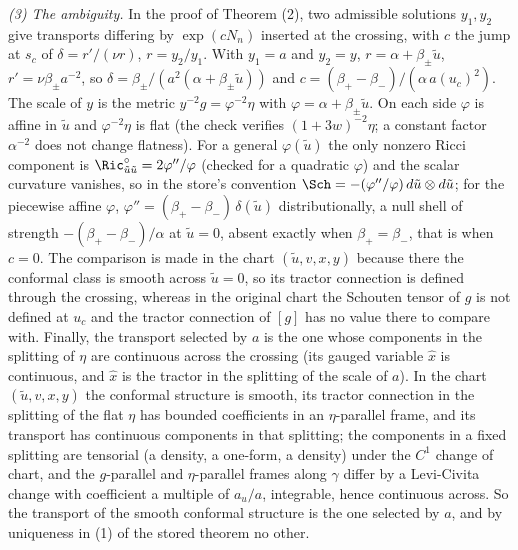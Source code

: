 \emph{(3) The ambiguity.} In the proof of Theorem (2), two admissible solutions $y_1, y_2$ give transports differing by $\exp(cN_n)$ inserted at the crossing, with $c$ the jump at $s_c$ of $\delta = r'/(\nu r)$, $r = y_2/y_1$. With $y_1 = a$ and $y_2 = y$, $r = \alpha + \beta_\pm\tilde u$, $r' = \nu\beta_\pm a^{-2}$, so $\delta = \beta_\pm/(a^2(\alpha + \beta_\pm\tilde u))$ and $c = (\beta_+ - \beta_-)/(\alpha\,a(u_c)^2)$. The scale of $y$ is the metric $y^{-2}g = \varphi^{-2}\eta$ with $\varphi = \alpha + \beta_\pm\tilde u$. On each side $\varphi$ is affine in $\tilde u$ and $\varphi^{-2}\eta$ is flat (the check verifies $(1 + 3w)^{-2}\eta$; a constant factor $\alpha^{-2}$ does not change flatness). For a general $\varphi(\tilde u)$ the only nonzero Ricci component is $\Ric^{\circ}_{\tilde u\tilde u} = 2\varphi''/\varphi$ (checked for a quadratic $\varphi$) and the scalar curvature vanishes, so in the store's convention $\Sch = -(\varphi''/\varphi)\,d\tilde u\otimes d\tilde u$; for the piecewise affine $\varphi$, $\varphi'' = (\beta_+ - \beta_-)\,\delta(\tilde u)$ distributionally, a null shell of strength $-(\beta_+ - \beta_-)/\alpha$ at $\tilde u = 0$, absent exactly when $\beta_+ = \beta_-$, that is when $c = 0$. The comparison is made in the chart $(\tilde u, v, x, y)$ because there the conformal class is smooth across $\tilde u = 0$, so its tractor connection is defined through the crossing, whereas in the original chart the Schouten tensor of $g$ is not defined at $u_c$ and the tractor connection of $[g]$ has no value there to compare with. Finally, the transport selected by $a$ is the one whose components in the splitting of $\eta$ are continuous across the crossing (its gauged variable $\hat x$ is continuous, and $\hat x$ is the tractor in the splitting of the scale of $a$). In the chart $(\tilde u, v, x, y)$ the conformal structure is smooth, its tractor connection in the splitting of the flat $\eta$ has bounded coefficients in an $\eta$-parallel frame, and its transport has continuous components in that splitting; the components in a fixed splitting are tensorial (a density, a one-form, a density) under the $C^1$ change of chart, and the $g$-parallel and $\eta$-parallel frames along $\gamma$ differ by a Levi-Civita change with coefficient a multiple of $a_u/a$, integrable, hence continuous across. So the transport of the smooth conformal structure is the one selected by $a$, and by uniqueness in (1) of the stored theorem no other.

